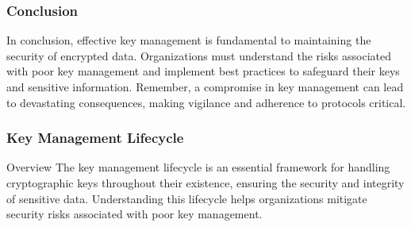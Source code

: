 \documentclass{beamer}
\begin{document}
\begin{frame}[fragile]
    \frametitle{Conclusion}
    In conclusion, effective key management is fundamental to maintaining the security of encrypted data. Organizations must understand the risks associated with poor key management and implement best practices to safeguard their keys and sensitive information. Remember, a compromise in key management can lead to devastating consequences, making vigilance and adherence to protocols critical.
\end{frame}

\begin{frame}[fragile]
    \frametitle{Key Management Lifecycle}
    \begin{block}{Overview}
        The key management lifecycle is an essential framework for handling cryptographic keys throughout their existence, ensuring the security and integrity of sensitive data. Understanding this lifecycle helps organizations mitigate security risks associated with poor key management.
    \end{block}
\end{frame}
\end{document}
